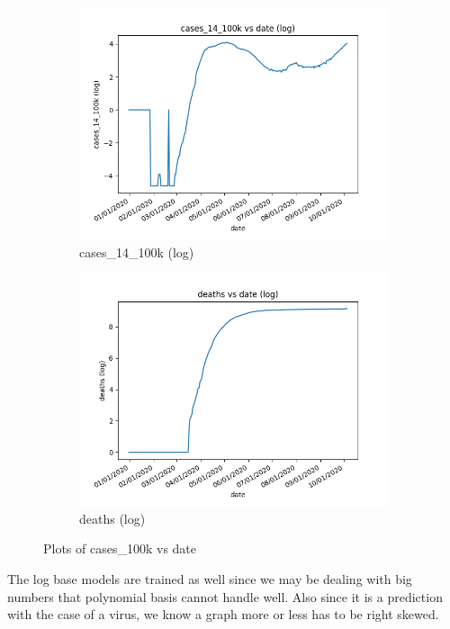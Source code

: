 \begin{figure}[h]
\begin{subfigure}[b]{0.24\linewidth}
        \includegraphics[width=\linewidth]{../figs/cases_14_100k_log.png}
        \caption{cases\_14\_100k (log)}
    \end{subfigure}
    \begin{subfigure}[b]{0.24\linewidth}
        \includegraphics[width=\linewidth]{../figs/deaths_log.png}
        \caption{deaths (log)}
    \end{subfigure}
    \caption{Plots of cases\_100k vs date}
\end{figure}

The log base models are trained as well since we may be dealing with big numbers that polynomial basis cannot handle well. Also since it is a prediction with the case of a virus, we know a graph more or less has to be right skewed. 


